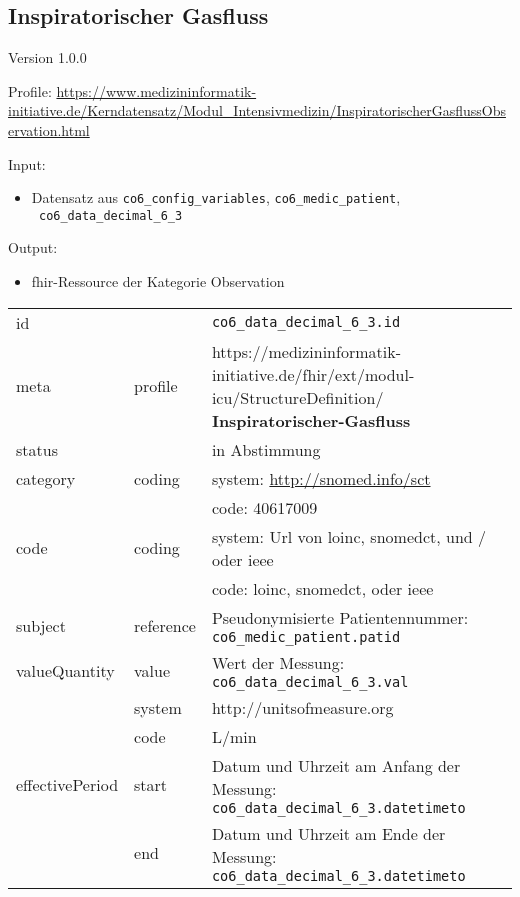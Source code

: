 \subsection{Inspiratorischer Gasfluss} 
\noindent Version 1.0.0

\noindent Profile: \url{https://www.medizininformatik-initiative.de/Kerndatensatz/Modul_Intensivmedizin/InspiratorischerGasflussObservation.html}

\noindent Input:
\begin{itemize}
	\item Datensatz aus \texttt{co6\_config\_variables}, \texttt{co6\_medic\_patient}, \\ \texttt{
co6\_data\_decimal\_6\_3}
\end{itemize}
Output:
\begin{itemize}
        \item \ac{fhir}-Ressource der Kategorie \glqq Observation\grqq{}
\end{itemize}
\begin{longtable}{|l|l|p{7.5cm}|}
        \hline
        \rowcolor{lightgray} \multicolumn{3}{|l|}{Data Mapping (inhaltlich)} \\ \hline
        id &  & \texttt{co6\_data\_decimal\_6\_3.id} \\ \hline
	meta & profile & https://medizininformatik-initiative.de/fhir/ext/modul-icu/StructureDefinition/\textbf{
Inspiratorischer-Gasfluss} \\ \hline 
	status &  & in Abstimmung  \\ \hline 
	category & coding & system: \url{http://snomed.info/sct} \\
\cline{3-3}
	& & code: 40617009 \\ \hline
	code & coding & system: Url von \ac{loinc}, \ac{snomedct}, und / oder \ac{ieee} \\ 
	\cline{3-3} 
	 &  & code: \ac{loinc}, \ac{snomedct}, oder \ac{ieee} \\ \hline
	subject & reference & Pseudonymisierte Patientennummer: \texttt{co6\_medic\_patient.patid} \\ \hline
	valueQuantity & value & Wert der Messung: \texttt{
co6\_data\_decimal\_6\_3.val} \\
        \cline{2-3}
         & system & http://unitsofmeasure.org \\
         \cline{2-3}
         & code & L/min
\\ \hline
    effectivePeriod & start & Datum und Uhrzeit am Anfang der Messung: \texttt{
co6\_data\_decimal\_6\_3.datetimeto} \\
    \cline{2-3}
     & end & Datum und Uhrzeit am Ende der Messung: \texttt{
co6\_data\_decimal\_6\_3.datetimeto} \\ \hline
\end{longtable}


